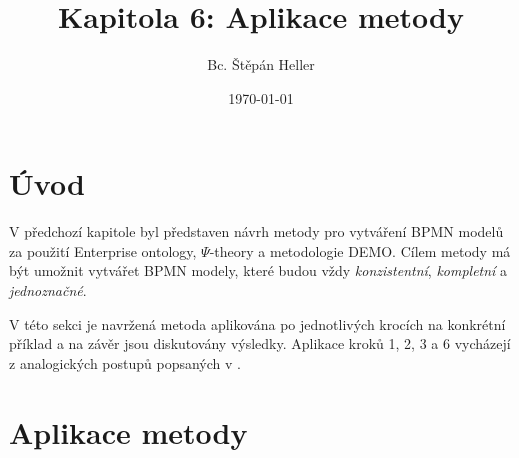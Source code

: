 \documentclass[]{article}
\newcommand{\ptheory}{$\Psi$-theory }
\begin{document}
\title{Kapitola 6: Aplikace metody}
\author{Bc. Štěpán Heller}
\date{\today}
\maketitle

\section{Úvod}
V předchozí kapitole byl představen návrh metody pro vytváření BPMN modelů za použití Enterprise ontology, \ptheory a metodologie DEMO. Cílem metody má být umožnit vytvářet BPMN modely, které budou vždy \textit{konzistentní}, \textit{kompletní} a \textit{jednoznačné}.

V této sekci je navržená metoda aplikována po jednotlivých krocích na konkrétní příklad a na závěr jsou diskutovány výsledky. Aplikace kroků 1, 2, 3 a 6 vycházejí z analogických postupů popsaných v \cite{Dietz2006}.

\section{Aplikace metody}
\end{document}
